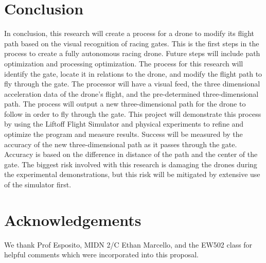 \documentclass[onecolumn,10pt]{IEEEtran}
\begin{document}

\section{Conclusion}
In conclusion, this research will create a process for a drone to modify its flight path based on the visual recognition of racing gates. This is the first steps in the process to create a fully autonomous racing drone. Future steps will include path optimization and processing optimization. The process for this research will identify the gate, locate it in relations to the drone, and modify the flight path to fly through the gate. The processor will have a visual feed, the three dimensional acceleration data of the drone’s flight, and the pre-determined three-dimensional path. The process will output a new three-dimensional path for the drone to follow in order to fly through the gate. This project will demonstrate this process by using the Liftoff Flight Simulator and physical experiments to refine and optimize the program and measure results. Success will be measured by the accuracy of the new three-dimensional path as it passes through the gate. Accuracy is based on the difference in distance of the path and the center of the gate. The biggest risk involved with this research is damaging the drones during the experimental demonstrations, but this risk will be mitigated by extensive use of the simulator first. 

\section*{Acknowledgements}
We thank Prof Esposito, MIDN 2/C Ethan Marcello, and the EW502 class for helpful comments which were incorporated into this proposal.
\end{document}
